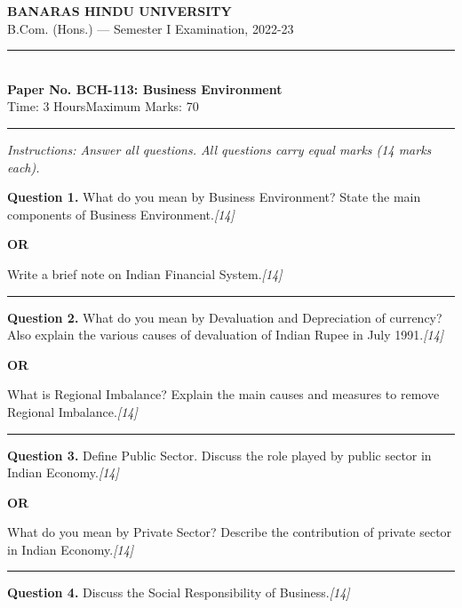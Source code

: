 \documentclass[11pt,a4paper]{article}
\newcommand{\pts}[1]{\hfill   \textit{[#1]}}
\begin{document}
\begin{center}
  {\large\bfseries BANARAS HINDU UNIVERSITY}\\[2pt]
  {\normalsize B.Com. (Hons.) --- Semester I Examination, 2022-23}\\[6pt]
  \rule{0.8\linewidth}{0.5pt}\\[6pt]
  {\large\bfseries Paper No. BCH-113: Business Environment}\\[4pt]
  {\normalsize Time: 3 Hours\hfill Maximum Marks: 70}
\end{center}

\rule{\linewidth}{0.4pt}

\smallskip



\noindent   \textit{Instructions: Answer all questions. All questions carry equal marks (14 marks each).}

\bigskip




\noindent   \textbf{Question 1.}
What do you mean by Business Environment? State the main components of Business Environment.\pts{14}

\centerline{   \textbf{OR}}

Write a brief note on Indian Financial System.\pts{14}

\medskip\rule{\linewidth}{0.2pt}




\noindent   \textbf{Question 2.}
What do you mean by Devaluation and Depreciation of currency? Also explain the various causes of devaluation of Indian Rupee in July 1991.\pts{14}

\centerline{   \textbf{OR}}

What is Regional Imbalance? Explain the main causes and measures to remove Regional Imbalance.\pts{14}

\medskip\rule{\linewidth}{0.2pt}




\noindent   \textbf{Question 3.}
Define Public Sector. Discuss the role played by public sector in Indian Economy.\pts{14}

\centerline{   \textbf{OR}}

What do you mean by Private Sector? Describe the contribution of private sector in Indian Economy.\pts{14}

\medskip\rule{\linewidth}{0.2pt}




\noindent   \textbf{Question 4.}
Discuss the Social Responsibility of Business.\pts{14}
\end{document}
